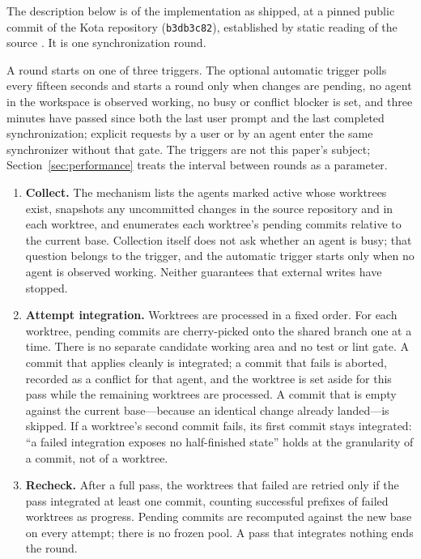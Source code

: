 \documentclass[pdflatex,sn-mathphys-ay]{sn-jnl}
\theoremstyle{thmstyleone}
\theoremstyle{thmstylethree}
\begin{document}
The description below is of the implementation as shipped, at a pinned public commit of the Kota repository (\texttt{b3db3c82}), established by static reading of the source \citep{kota-source}. It is one synchronization round.

A round starts on one of three triggers. The optional automatic trigger polls every fifteen seconds and starts a round only when changes are pending, no agent in the workspace is observed working, no busy or conflict blocker is set, and three minutes have passed since both the last user prompt and the last completed synchronization; explicit requests by a user or by an agent enter the same synchronizer without that gate. The triggers are not this paper's subject; Section~\ref{sec:performance} treats the interval between rounds as a parameter.

\begin{enumerate}
\def\labelenumi{\arabic{enumi}.}
\item
  \textbf{Collect.} The mechanism lists the agents marked active whose worktrees exist, snapshots any uncommitted changes in the source repository and in each worktree, and enumerates each worktree's pending commits relative to the current base. Collection itself does not ask whether an agent is busy; that question belongs to the trigger, and the automatic trigger starts only when no agent is observed working. Neither guarantees that external writes have stopped.
\item
  \textbf{Attempt integration.} Worktrees are processed in a fixed order. For each worktree, pending commits are cherry-picked onto the shared branch one at a time. There is no separate candidate working area and no test or lint gate. A commit that applies cleanly is integrated; a commit that fails is aborted, recorded as a conflict for that agent, and the worktree is set aside for this pass while the remaining worktrees are processed. A commit that is empty against the current base---because an identical change already landed---is skipped. If a worktree's second commit fails, its first commit stays integrated: ``a failed integration exposes no half-finished state'' holds at the granularity of a commit, not of a worktree.
\item
  \textbf{Recheck.} After a full pass, the worktrees that failed are retried only if the pass integrated at least one commit, counting successful prefixes of failed worktrees as progress. Pending commits are recomputed against the new base on every attempt; there is no frozen pool. A pass that integrates nothing ends the round.

\end{enumerate}
\end{document}
